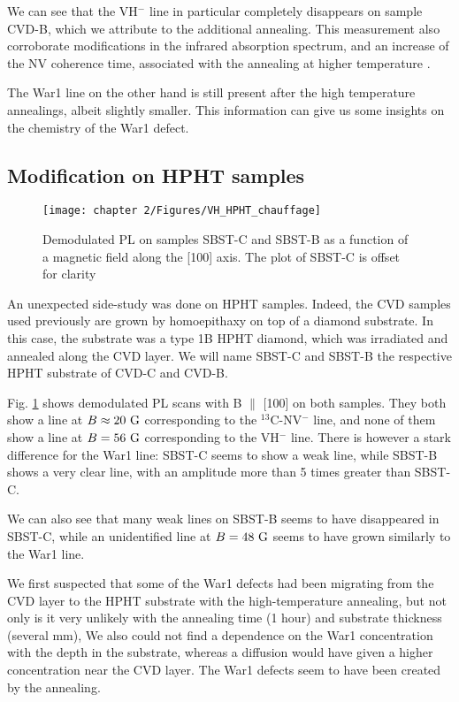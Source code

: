 \documentclass[a4paper, 11pt]{book}
\begin{document}
We can see that the VH$^-$ line in particular completely disappears on sample CVD-B, which we attribute to the additional annealing. This measurement also corroborate modifications in the infrared absorption spectrum, and an increase of the NV coherence time, associated with the annealing at higher temperature \citep{ngambou2022improving}.

The War1 line on the other hand is still present after the high temperature annealings, albeit slightly smaller. This information can give us some insights on the chemistry of the War1 defect. %

\subsection{Modification on HPHT samples}

\begin{figure}[h]
\centering
\texttt{[image: chapter 2/Figures/VH\_HPHT\_chauffage]}
\caption{Demodulated PL on samples SBST-C and SBST-B as a function of a magnetic field along the [100] axis. The plot of SBST-C is offset for clarity}
\label{chauffage HPHT}
\end{figure}

An unexpected side-study was done on HPHT samples. Indeed, the CVD samples used previously are grown by homoepithaxy on top of a diamond substrate. In this case, the substrate was a type 1B HPHT diamond, which was irradiated and annealed along the CVD layer. We will name SBST-C and SBST-B the respective HPHT substrate of CVD-C and CVD-B.

Fig. \ref{chauffage HPHT} shows demodulated PL scans with B $\parallel$ [100] on both samples. They both show a line at $B \approx 20\ \rm G$ corresponding to the $^{13}$C-NV$^-$ line, and none of them show a line at $B = 56\ \rm G$ corresponding to the VH$^-$ line. There is however a stark difference for the War1 line: SBST-C seems to show a weak line, while SBST-B shows a very clear line, with an amplitude more than 5 times greater than SBST-C. 

We can also see that many weak lines on SBST-B seems to have disappeared in SBST-C, while an unidentified line at $B = 48\ \rm G$ seems to have grown similarly to the War1 line.

We first suspected that some of the War1 defects had been migrating from the CVD layer to the HPHT substrate with the high-temperature annealing, but not only is it very unlikely with the annealing time (1 hour) and substrate thickness (several mm), We also could not find a dependence on the War1 concentration with the depth in the substrate, whereas a diffusion would have given a higher concentration near the CVD layer. The War1 defects seem to have been created by the annealing.
\end{document}
